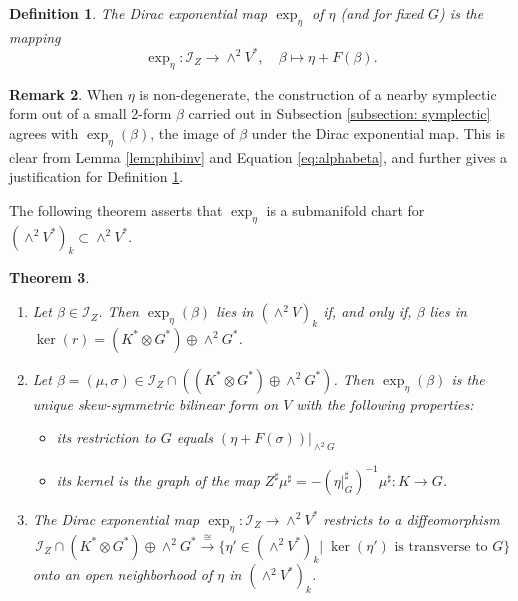 \documentclass[11pt,thmsa]{amsart}
\newtheorem{theorem}{Theorem}[section]
\newtheorem{definition}[theorem]{Definition}
\theoremstyle{definition}
\newtheorem{remark}[theorem]{Remark}
\begin{document}
\begin{definition}\label{definition: Dirac exponential map}
The Dirac exponential map $\exp_{\eta}$ of $\eta$ (and for fixed $G$) is the mapping
$${\exp_{\eta}}\colon \mathcal{I}_Z \to \wedge^2 V^*, \quad \beta \mapsto \eta + 
F(\beta).$$ 
\end{definition}


\begin{remark}\label{rem:symexp}
When $\eta$ is non-degenerate, the construction of a nearby symplectic  form out of a small 2-form $\beta$ carried out in Subsection \ref{subsection: symplectic} agrees with $\exp_{\eta}(\beta)$, the image of $\beta$ under the Dirac exponential map.
This is clear from Lemma \ref{lem:phibinv} and Equation \eqref{eq:alphabeta}, and further  gives a justification for Definition \ref{definition: Dirac exponential map}.
\end{remark}


The following theorem asserts that $\exp_{\eta}$ is a submanifold chart for $(\wedge^2 V^*)_k \subset \wedge^2 V^*$.


\begin{theorem}\label{theorem: almost Dirac structures}
\hspace{0cm}
\begin{enumerate}
\item[(i)] Let $\beta \in \mathcal{I}_Z$. Then 
 $\exp_{\eta}(\beta)$ lies in $(\wedge^2 V)_k$ if, and only if, $\beta$ lies in $\ker(r)=(K^*\otimes G^*)\oplus \wedge^2G^*$.

\item[(ii)] 
Let $\beta = (\mu,\sigma) \in \mathcal{I}_Z\cap ((K^*\otimes G^*)\oplus \wedge^2G^*)$. Then  $\exp_{\eta}(\beta)$ is the unique skew-symmetric bilinear form on $V$ with the following properties:
\begin{itemize}
\item  its restriction to $G$ equals {$(\eta+F(\sigma))|_{\wedge^2G}$}
\item its kernel is the graph of the map $Z^\sharp \mu^\sharp= -(\eta\vert_G^{\sharp})^{-1}\mu^\sharp: K\to G$.
\end{itemize}

\item[(iii)]
The Dirac exponential map $\exp_{\eta}: \mathcal{I}_Z \to \wedge^2 V^*$ restricts to a 
diffeomorphism 
$$\mathcal{I}_Z \cap (K^*\otimes G^*)\oplus \wedge^2G^* \stackrel{\cong}{\longrightarrow}
{\{\eta' \in (\wedge^2 V^*)_k|\; \ker(\eta') \text{ is transverse to $G$}\}}
$$
onto an open neighborhood of $\eta$  in  $(\wedge^2 V^*)_k$.
\end{enumerate}
\end{theorem}
\end{document}
